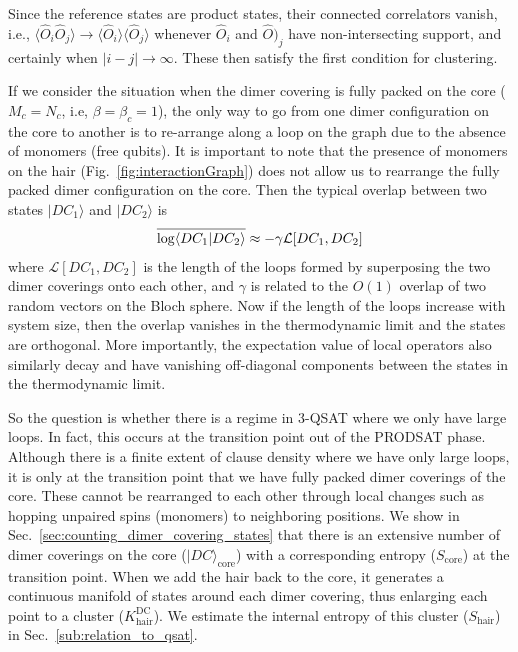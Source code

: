 \documentclass[aps,pra,twocolumn,superscriptaddress,amsmath]{revtex4-1}
\newcommand{\Sc}{S_{\mathrm{core}}}
\begin{document}
Since the reference states are product states, their connected correlators vanish, i.e., $\langle \hat{O}_i \hat{O}_j \rangle \rightarrow \langle \hat{O}_i \rangle \langle \hat{O}_j \rangle$ whenever $\hat{O}_i$ and $\hat{O})_j$ have non-intersecting support, and certainly when $|i - j| \to \infty$. These then satisfy the first condition for clustering. 

If we consider the situation when the dimer covering is fully packed on the core ($M_c=N_c$, i.e, $\beta=\beta_c=1$), the only way to go from one dimer configuration on the core to another is to re-arrange along a loop on the graph due to the absence of monomers (free qubits). It is important to note that the presence of monomers on the hair (Fig.~\ref{fig:interactionGraph}) does not allow us to rearrange the fully packed dimer configuration on the core. Then the typical overlap between two states $|DC_1 \rangle$ and $|DC_2 \rangle$ is 
\begin{equation}
\overline{\log\langle DC_1 | DC_2 \rangle \strut} \approx -\gamma \mathcal{L}[DC_1, DC_2]
\end{equation}
where $\mathcal{L}[DC_1, DC_2]$ is the length of the loops formed by superposing the two dimer coverings onto each other, and $\gamma$ is related to the $O(1)$ overlap of two random vectors on the Bloch sphere. Now if the length of the loops increase with system size, then the overlap vanishes in the thermodynamic limit and the states are orthogonal. More importantly, the expectation value of local operators also similarly decay and  have vanishing off-diagonal components between the states in the thermodynamic limit.

So the question is whether there is a regime in 3-QSAT where we only have large loops. In fact, this occurs at the transition point out of the PRODSAT phase. Although there is a finite extent of clause density where we have only large loops, it is only at the transition point that we have fully packed dimer coverings of the core. These cannot be rearranged to each other through local changes such as hopping unpaired spins (monomers) to neighboring positions. We show in Sec.~\ref{sec:counting_dimer_covering_states} that there is an extensive number of dimer coverings on the core ($|DC\rangle_{\mathrm{core}}$) with a corresponding entropy ($\Sc$) at the transition point. When we add the hair back to the core, it generates a continuous manifold of states around each dimer covering, thus enlarging each point to a cluster ($K^{\mathrm{DC}}_{\mathrm{hair}}$). We estimate the internal entropy of this cluster ($S_{\mathrm{hair}}$) in Sec.~\ref{sub:relation_to_qsat}. 
\end{document}
